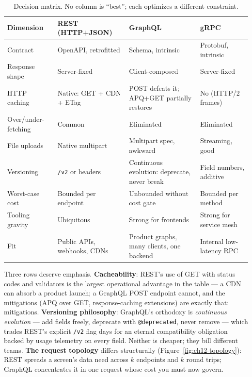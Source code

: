 \begin{table}[h]
  \centering
  \small
  \begin{tabularx}{\textwidth}{l X X X}
    \toprule
    \textbf{Dimension} & \textbf{REST (HTTP+JSON)} & \textbf{GraphQL} & \textbf{gRPC} \\
    \midrule
    Contract & OpenAPI, retrofitted & Schema, intrinsic \cite{graphqlspec} & Protobuf, intrinsic \\
    Response shape & Server-fixed & Client-composed & Server-fixed \\
    HTTP caching & Native: GET + CDN + ETag & POST defeats it; APQ+GET partially restores & No (HTTP/2 frames) \\
    Over/under-fetching & Common & Eliminated & Eliminated \\
    File uploads & Native multipart & Multipart spec, awkward & Streaming, good \\
    Versioning & \texttt{/v2} or headers & Continuous evolution: deprecate, never break & Field numbers, additive \\
    Worst-case cost & Bounded per endpoint & Unbounded without cost gate & Bounded per method \\
    Tooling gravity & Ubiquitous & Strong for frontends & Strong for service mesh \\
    Fit & Public APIs, webhooks, CDNs & Product graphs, many clients, one backend & Internal low-latency RPC \\
    \bottomrule
  \end{tabularx}
  \caption{Decision matrix. No column is ``best''; each optimizes a
           different constraint.}
  \label{tab:ch12-matrix}
\end{table}

Three rows deserve emphasis. \textbf{Cacheability}: REST's use of GET with
status codes and validators is the largest operational advantage in the
table --- a CDN can absorb a product launch; a GraphQL POST endpoint
cannot, and the mitigations (APQ over GET, response-caching extensions)
are exactly that: mitigations. \textbf{Versioning philosophy}: GraphQL's
orthodoxy is \emph{continuous evolution} --- add fields freely, deprecate
with \texttt{@deprecated}, never remove --- which trades REST's explicit
\texttt{/v2} flag days for an eternal compatibility obligation backed by
usage telemetry on every field. Neither is cheaper; they bill different
teams. \textbf{The request topology} differs structurally
(Figure~\ref{fig:ch12-topology}): REST spreads a screen's data need across
$k$ endpoints and $k$ round trips; GraphQL concentrates it in one request
whose cost you must now govern.


